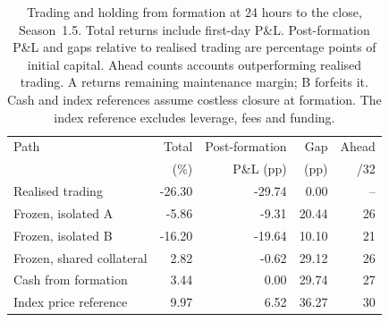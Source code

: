 \begin{table}[ht]
\centering\small
\caption{Trading and holding from formation at 24 hours to the close,
Season~1.5. Total returns include first-day P\&L. Post-formation P\&L and
gaps relative to realised trading are percentage points of initial capital.
Ahead counts accounts outperforming realised trading. A returns remaining
maintenance margin; B forfeits it. Cash and index references assume costless
closure at formation. The index reference excludes leverage, fees and funding.}
\label{tab:frozen}
\setlength{\tabcolsep}{3pt}
\begin{tabular}{lrrrr}
\toprule
Path & Total & Post-formation & Gap & Ahead \\
 & (\%) & P\&L (pp) & (pp) & /32 \\
\midrule
Realised trading & -26.30 & -29.74 & 0.00 & -- \\
Frozen, isolated A & -5.86 & -9.31 & 20.44 & 26 \\
Frozen, isolated B & -16.20 & -19.64 & 10.10 & 21 \\
Frozen, shared collateral & 2.82 & -0.62 & 29.12 & 26 \\
Cash from formation & 3.44 & 0.00 & 29.74 & 27 \\
Index price reference & 9.97 & 6.52 & 36.27 & 30 \\
\bottomrule
\end{tabular}
\end{table}
